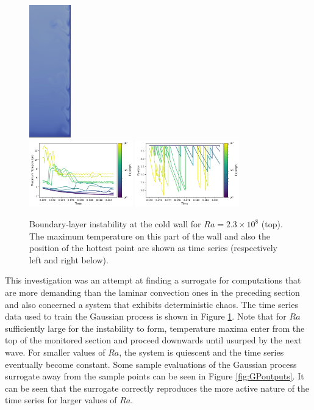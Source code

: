 \begin{figure}[tbp]
\begin{centering}
\includegraphics[height=0.6\textheight]{wall_waves.png}\\
\includegraphics[width=0.4\textwidth]{gp_observed_max_temp.png}
\includegraphics[width=0.4\textwidth]{gp_observed_position.png}
\caption{\small Boundary-layer instability at the cold wall for $Ra=2.3 \times 10^8$ (top). 
The maximum temperature on this part of the wall and also the position of the hottest point are shown as time series (respectively left and right below).
\label{fig:wallwavesetc}
}
\par
\end{centering}
\end{figure}

This investigation was an attempt at finding a surrogate for computations that are more demanding than the laminar convection ones in the preceding section and also concerned a system that exhibits deterministic chaos.
The time series data used to train the Gaussian process is shown in Figure \ref{fig:wallwavesetc}.  
Note that for $Ra$ sufficiently large for the instability to form, temperature maxima enter from the top of the monitored section and proceed downwards until usurped by the next wave.  
For smaller values of $Ra$, the system is quiescent and the time series eventually become constant.
Some sample evaluations of the Gaussian process surrogate away from the sample points can be seen in Figure \ref{fig:GPoutputs}.  It can be seen that the surrogate correctly reproduces the more active nature of the time series for larger values of $Ra$.

